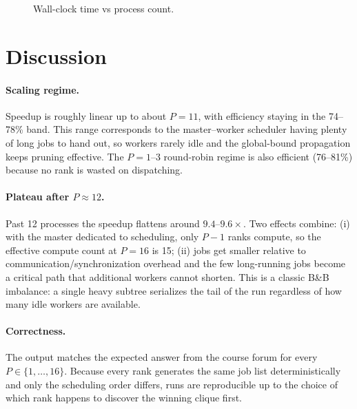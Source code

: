 \documentclass[11pt]{article}
\begin{document}
\begin{figure}[H]
\centering
{}
\caption{Wall-clock time vs process count.}
\end{figure}

\section{Discussion}

\paragraph{Scaling regime.} Speedup is roughly linear up to about $P=11$, with efficiency staying in the 74--78\% band. This range corresponds to the master--worker scheduler having plenty of long jobs to hand out, so workers rarely idle and the global-bound propagation keeps pruning effective. The $P=1$--$3$ round-robin regime is also efficient (76--81\%) because no rank is wasted on dispatching.

\paragraph{Plateau after $P \approx 12$.} Past 12 processes the speedup flattens around $9.4$--$9.6\times$. Two effects combine: (i) with the master dedicated to scheduling, only $P-1$ ranks compute, so the effective compute count at $P=16$ is 15; (ii) jobs get smaller relative to communication/synchronization overhead and the few long-running jobs become a critical path that additional workers cannot shorten. This is a classic B\&B imbalance: a single heavy subtree serializes the tail of the run regardless of how many idle workers are available.

\paragraph{Correctness.} The output matches the expected answer from the course forum for every $P \in \{1,\ldots,16\}$. Because every rank generates the same job list deterministically and only the scheduling order differs, runs are reproducible up to the choice of which rank happens to discover the winning clique first.
\end{document}
